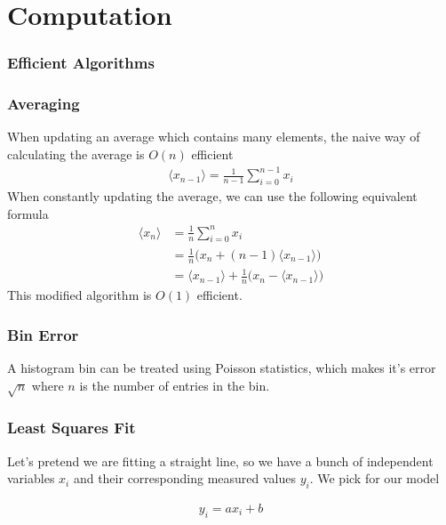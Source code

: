\chapter{Computation}

\subsection{Efficient Algorithms}

\subsection{Averaging}
When updating an average which contains many elements, the naive way of calculating the average is $O(n)$ efficient 
\begin{align}
	\langle x_{n-1}\rangle = \frac{1}{n-1}\sum_{i=0}^{n-1} x_i
\end{align}
When constantly updating the average, we can use the following equivalent formula
\begin{align}
	\langle x_{n}\rangle &= \frac{1}{n}\sum_{i=0}^{n} x_i\\
	&= \frac{1}{n}\Big(x_n + (n-1)\langle x_{n-1}\rangle\Big)\\
	&= \langle x_{n-1}\rangle + \frac{1}{n}\Big(x_n - \langle x_{n-1} \rangle\Big)
\end{align}
This modified algorithm is $O(1)$ efficient.
\subsection{Bin Error}
A histogram bin can be treated using Poisson statistics, which makes it's error $\sqrt{n}$ where $n$ is the number of entries in the bin.


\subsection{Least Squares Fit}\label{least-squares}
Let's pretend we are fitting a straight line, so we have a bunch of independent variables $x_i$ and their corresponding measured values $y_i$. We pick for our model

\begin{align}
y_i = ax_i + b
\end{align}

